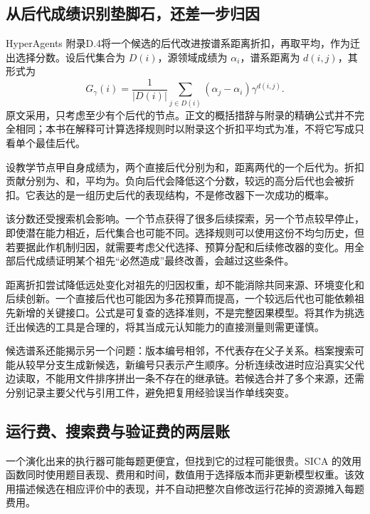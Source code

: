 \subsection{从后代成绩识别垫脚石，还差一步归因}
\label{sec:ch12-descendants}

HyperAgents 附录D.4将一个候选的后代改进按谱系距离折扣，再取平均，作为迁出选择分数。设后代集合为 $D(i)$，源领域成绩为 $\alpha_i$，谱系距离为 $d(i,j)$，其形式为
\begin{equation}
 G_\gamma(i)=\frac{1}{|D(i)|}\sum_{j\in D(i)}(\alpha_j-\alpha_i)\gamma^{d(i,j)}.
 \label{eq:ch12-growth}
\end{equation}
原文采用，只考虑至少有个后代的节点\cite{hyperagents-2603}。正文的概括措辞与附录的精确公式并不完全相同；本书在解释可计算选择规则时以附录这个折扣平均式为准，不将它写成只看单个最佳后代。

设教学节点甲自身成绩为，两个直接后代分别为和，距离两代的一个后代为。折扣贡献分别为、和，平均为。负向后代会降低这个分数，较远的高分后代也会被折扣。它表达的是一组历史后代的表现结构，不是修改器下一次成功的概率。

该分数还受搜索机会影响。一个节点获得了很多后续探索，另一个节点较早停止，即使潜在能力相近，后代集合也可能不同。选择规则可以使用这份不均匀历史，但若要据此作机制归因，就需要考虑父代选择、预算分配和后续修改器的变化。用全部后代成绩证明某个祖先“必然造成”最终改善，会越过这些条件。

距离折扣尝试降低远处变化对祖先的归因权重，却不能消除共同来源、环境变化和后续创新。一个直接后代也可能因为多花预算而提高，一个较远后代也可能依赖祖先新增的关键接口。公式是可复查的选择准则，不是完整因果模型。将其作为挑选迁出候选的工具是合理的，将其当成元认知能力的直接测量则需更谨慎。

候选谱系还能揭示另一个问题：版本编号相邻，不代表存在父子关系。档案搜索可能从较早分支生成新候选，新编号只表示产生顺序。分析连续改进时应沿真实父代边读取，不能用文件排序拼出一条不存在的继承链。若候选合并了多个来源，还需分别记录主要父代与引用工件，避免把复用经验误当作单线突变。

\subsection{运行费、搜索费与验证费的两层账}
\label{sec:ch12-searchcost}

一个演化出来的执行器可能每题更便宜，但找到它的过程可能很贵。SICA 的效用函数同时使用题目表现、费用和时间，数值用于选择版本而非更新模型权重\cite{sica-2504}。该效用描述候选在相应评价中的表现，并不自动把整次自修改运行花掉的资源摊入每题费用。

